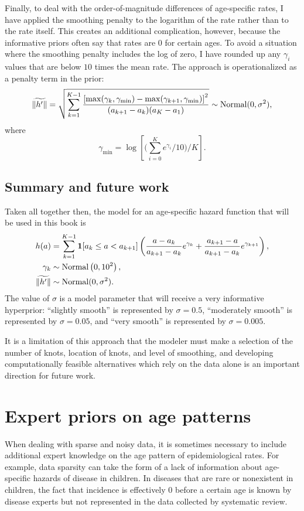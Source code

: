 Finally, to deal with the order-of-magnitude differences of
age-specific rates, I have applied the smoothing penalty to the
logarithm of the rate rather than to the rate itself.  This creates an additional
complication, however, because the informative priors often say that
rates are $0$ for certain ages.  To avoid a situation where the smoothing penalty includes the log of zero, I have
rounded up any $\gamma_i$ values that are below $10$ times the mean
rate.  The approach is operationalized as a penalty term in the prior:
\[
\widetilde{\|h'\|} = \sqrt{\sum_{k=1}^{K-1}
\frac{\left[\max(\gamma_k, \gamma_{\min})
-
\max(\gamma_{k+1}, \gamma_{\min})\right]^2
}{(a_{k+1}-a_k)(a_K-a_1)}} \sim \operatorname{Normal}(0, \sigma^2),
\]
where
\[
\gamma_{\min} = \log\left[\bigg(\sum_{i=0}^K e^{\gamma_i}/10\bigg)
/ K\right].
\]

\section{Summary and future work}
Taken all together then, the model for an age-specific hazard function
that will be used in this book is
\begin{align*}
h(a) &= \sum_{k=1}^{K-1} \mathbf{1}[a_k \leq a < a_{k+1}]
\left( \frac{a-a_k}    {a_{k+1}-a_k} e^{\gamma_k}
     + \frac{a_{k+1}-a}{a_{k+1}-a_k} e^{\gamma_{k+1}}\right),\\
\gamma_k &\sim \operatorname{Normal}\left(0, 10^2\right),\\
\widetilde{\|h'\|} &\sim \operatorname{Normal}(0, \sigma^2).\\
\end{align*}
The value of $\sigma$ is a model parameter that will receive a very
informative hyperprior: ``slightly smooth'' is represented by
$\sigma=0.5$, ``moderately smooth'' is represented by $\sigma=0.05$,
and ``very smooth'' is represented by $\sigma=0.005$.

It is a limitation of this approach that the modeler must make a
selection of the number of knots, location of knots, and level of
smoothing, and developing computationally feasible alternatives which
rely on the data alone is an important direction for future work.




\chapter{Expert priors on age patterns}
\label{theory-expert_priors}

When dealing with sparse and noisy data, it is sometimes necessary to
include additional expert knowledge on the age pattern of
epidemiological rates.  For example, data sparsity can take the form
of a lack of information about age-specific hazards of disease in children.  In
diseases that are rare or nonexistent in children, the fact that incidence is
effectively $0$ before a certain age is known by disease experts but
not represented in the data collected by systematic review.

